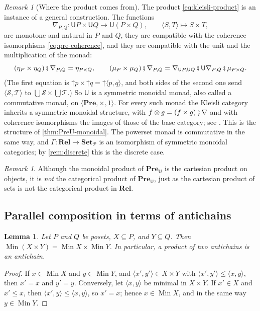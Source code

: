 \documentclass[11pt,a4paper]{article}
\theoremstyle{plain}
\newtheorem{lemma}[theorem]{Lemma}
\theoremstyle{definition}
\theoremstyle{remark}
\newtheorem{remark}[theorem]{Remark}
\newcommand{\Cat}[1]{\mathbf{#1}}
\newcommand{\Set}{\Cat{Set}}
\newcommand{\Rel}{\Cat{Rel}}
\newcommand{\Pre}{\Cat{Pre}}
\newcommand{\U}{\mathsf{U}}
\newcommand{\pow}{\mathcal{P}}
\newcommand{\SetP}{\Set_{\pow}}
\newcommand{\PreU}{\Pre_{\U}}
\newcommand{\then}{\mathbin{\fatsemi}}
\newcommand{\tup}[1]{\langle #1 \rangle}
\newcommand{\up}{\mathord{\uparrow}}
\DeclareMathOperator{\Min}{Min}
\begin{document}
\begin{remark}[Where the product comes from]
    \label{rem:monoidal-monad}
    The product \cref{eq:kleisli-product} is an instance of a general construction.
    The functions
    \begin{equation*}
        \nabla_{P,Q} \colon \U P \times \U Q \to \U(P \times Q),
        \qquad
        \tup{S,T} \mapsto S \times T,
    \end{equation*}
    are monotone and natural in $P$ and $Q$, they are compatible with the coherence isomorphisms \cref{eq:pre-coherence}, and they are compatible with the unit and the multiplication of the monad:
    \begin{equation*}
        (\eta_P \times \eta_Q) \then \nabla_{P,Q} = \eta_{P \times Q},
        \qquad
        (\mu_P \times \mu_Q) \then \nabla_{P,Q} = \nabla_{\U P, \U Q} \then \U\nabla_{P,Q} \then \mu_{P \times Q}.
    \end{equation*}
    (The first equation is $\up p \times \up q = \up\tup{p,q}$, and both sides of the second one send $\tup{\mathcal{S},\mathcal{T}}$ to $\bigcup\mathcal{S} \times \bigcup\mathcal{T}$.)
    So $\U$ is a symmetric monoidal monad, also called a commutative monad, on $\tup{\Pre, \times, 1}$.
    For every such monad the Kleisli category inherits a symmetric monoidal structure, with $f \otimes g = (f \times g) \then \nabla$ and with coherence isomorphisms the images of those of the base category; see \cite{kock,power-robinson}.
    This is the structure of \cref{thm:PreU-monoidal}.
    The powerset monad is commutative in the same way, and $\Gamma \colon \Rel \to \SetP$ is an isomorphism of symmetric monoidal categories; by \cref{rem:discrete} this is the discrete case.
\end{remark}

\begin{remark}
    Although the monoidal product of $\PreU$ is the cartesian product on objects, it is \emph{not} the categorical product of $\PreU$, just as the cartesian product of sets is not the categorical product in $\Rel$.
\end{remark}

\subsection{Parallel composition in terms of antichains}

\begin{lemma}
    \label{lem:min-product}
    Let $P$ and $Q$ be posets, $X \subseteq P$, and $Y \subseteq Q$.
    Then $\Min(X \times Y) = \Min X \times \Min Y$.
    In particular, a product of two antichains is an antichain.
\end{lemma}
\begin{proof}
    If $x \in \Min X$ and $y \in \Min Y$, and $\tup{x',y'} \in X \times Y$ with $\tup{x',y'} \leq \tup{x,y}$, then $x' = x$ and $y' = y$.
    Conversely, let $\tup{x,y}$ be minimal in $X \times Y$.
    If $x' \in X$ and $x' \leq x$, then $\tup{x',y} \leq \tup{x,y}$, so $x' = x$; hence $x \in \Min X$, and in the same way $y \in \Min Y$.
\end{proof}
\end{document}
